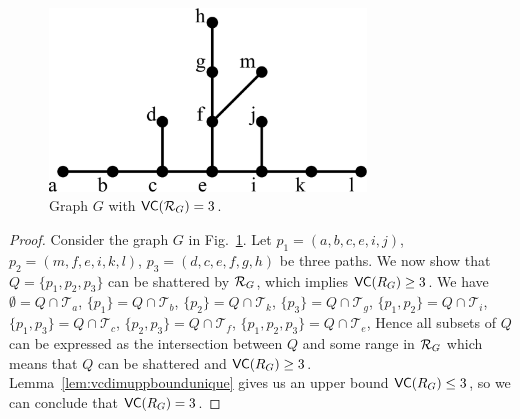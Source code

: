 \begin{figure}[ht]
  \centering
  \includegraphics[width=0.75\textwidth,keepaspectratio]{centrsampl/figures/eps/uniqueshortestpathtight}
  \caption{Graph $G$ with $\mathsf{VC}(\mathcal{R}_G)= 3$.}
  \label{fig:centrsampluniquetight}
\end{figure}

\begin{proof}
  Consider the graph $G$ in Fig.~\ref{fig:centrsampluniquetight}.
  Let $p_1=(a,b,c,e,i,j)$, $p_2=(m,f,e,i,k,l)$, $p_3=(d,c,e,f,g,h)$ be three
  paths. We now show that $Q=\{p_1,p_2,p_3\}$ can be shattered by $\mathcal{R}_G$, which
  implies $\mathsf{VC}(R_G)\ge 3$. We have $\emptyset=Q\cap\mathcal{T}_a$,
  $\{p_1\}=Q\cap\mathcal{T}_b$, $\{p_2\}=Q\cap\mathcal{T}_k$,
  $\{p_3\}=Q\cap\mathcal{T}_g$, $\{p_1,p_2\}=Q\cap\mathcal{T}_i$,
  $\{p_1,p_3\}=Q\cap\mathcal{T}_c$, $\{p_2,p_3\}=Q\cap\mathcal{T}_f$,
  $\{p_1,p_2,p_3\}=Q\cap\mathcal{T}_e$,  
  Hence all subsets of $Q$ can be expressed as the intersection between $Q$ and
  some range in $\mathcal{R}_G$ which means that $Q$ can be shattered and
  $\mathsf{VC}(R_G)\ge 3$. Lemma~\ref{lem:vcdimuppboundunique} gives us an upper
  bound $\mathsf{VC}(R_G)\le3$, so we can conclude that $\mathsf{VC}(R_G)=3$.
\end{proof}

